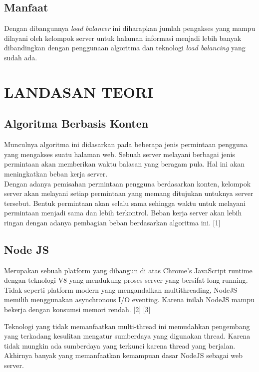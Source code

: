 \documentclass{ta-its}
\begin{document}
        \section{Manfaat}
			Dengan dibangunnya \emph{load balancer} ini diharapkan jumlah pengakses yang mampu dilayani oleh kelompok server untuk halaman informasi menjadi lebih banyak dibandingkan dengan penggunaan algoritma dan teknologi \emph{load balancing} yang sudah ada.

   \chapter{LANDASAN TEORI}
        \section{Algoritma Berbasis Konten}
			Munculnya algoritma ini didasarkan pada beberapa jenis permintaan pengguna yang mengakses suatu halaman web. Sebuah server melayani berbagai jenis permintaan akan memberikan waktu balasan yang beragam pula. Hal ini akan meningkatkan beban kerja server. \\
			\indent Dengan adanya pemisahan permintaan pengguna berdasarkan konten, kelompok server akan melayani setiap permintaan yang memang ditujukan untuknya server tersebut. Bentuk permintaan akan selalu sama sehingga waktu untuk melayani permintaan menjadi sama dan lebih terkontrol. Beban kerja server akan lebih ringan dengan adanya pembagian beban berdasarkan algoritma ini. [1]

        \section{Node JS}
			Merupakan sebuah platform yang dibangun di atas Chrome's JavaScript runtime dengan teknologi V8 yang mendukung proses server yang bersifat long-running. Tidak seperti platform modern yang mengandalkan multithreading, NodeJS memilih menggunakan asynchronous I/O eventing. Karena inilah NodeJS mampu bekerja dengan konsumsi memori rendah. [2] [3]
			
			Teknologi yang tidak memanfaatkan multi-thread ini memudahkan pengembang yang terkadang kesulitan mengatur sumberdaya yang digunakan thread. Karena tidak mungkin ada sumberdaya yang terkunci karena thread yang berjalan. Akhirnya banyak yang memanfaatkan kemampuan dasar NodeJS sebagai web server.
			
\end{document}
